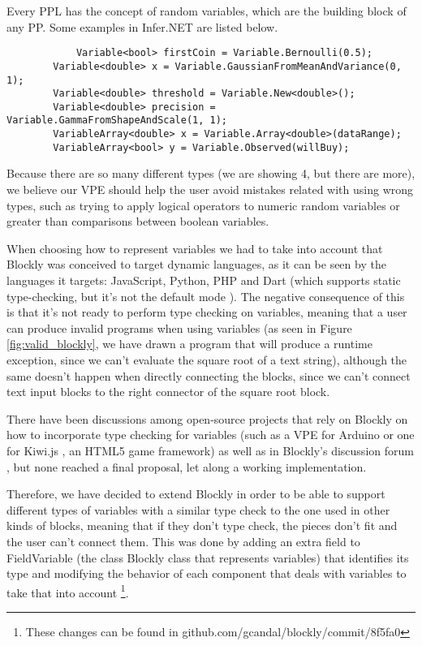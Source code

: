 Every PPL has the concept of random variables, which are the building block of
any PP. Some examples in Infer.NET are listed below.

\begin{lstlisting}
  			Variable<bool> firstCoin = Variable.Bernoulli(0.5);
        Variable<double> x = Variable.GaussianFromMeanAndVariance(0, 1);
        Variable<double> threshold = Variable.New<double>();
        Variable<double> precision = Variable.GammaFromShapeAndScale(1, 1);
        VariableArray<double> x = Variable.Array<double>(dataRange);
        VariableArray<bool> y = Variable.Observed(willBuy);
\end{lstlisting}

Because there are so many different types (we are showing 4, but there are more),
we believe our VPE should help the user avoid mistakes related with using wrong
types, such as trying to apply logical operators to numeric random variables or
greater than comparisons between boolean variables.

When choosing how to represent variables we had to take into account that
Blockly was conceived to target dynamic languages, as it can be seen by the languages
it targets: JavaScript, Python, PHP and Dart (which supports static type-checking,
but it's not the default mode \cite{dart}). The negative consequence of this is that it's
not ready to perform type checking on variables, meaning that a user can
produce invalid programs when using variables (as seen in Figure \ref{fig:valid_blockly}, we have
drawn a program that will produce a runtime exception, since we can't evaluate
the square root of a text string), although the same doesn't happen when
directly connecting the blocks, since we can't connect text input blocks to the
right connector of the square root block.

There have been discussions among open-source projects that rely on Blockly on how
to incorporate type checking for variables (such as a VPE for Arduino \cite{bduino}
or one for Kiwi.js \cite{gbl}, an HTML5 game framework) as well as in Blockly's
discussion forum \cite{gbl2}, but none reached a final proposal, let along a working
implementation.

Therefore, we have decided to extend Blockly in order to be able to support
different types of variables with a similar type check to the one used in other
kinds of blocks, meaning that if they don't type check, the pieces don't fit and the user
can't connect them. This was done by adding an extra field to FieldVariable
(the class Blockly class that represents variables) that identifies its type and
modifying the behavior of each component that deals with variables to take that
into account \footnote{These changes can be found in github.com/gcandal/blockly/commit/8f5fa0}.

